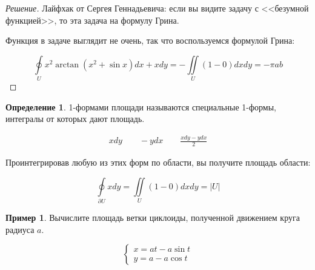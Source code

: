 \documentclass[a5paper]{article}
\newcounter{through}
\theoremstyle{plain}
\theoremstyle{definition}
\newtheorem{definition}[through]{Определение}
\newtheorem{example}[through]{Пример}
\numberwithin{through}{section}
\numberwithin{equation}{section}
\begin{document}
\begin{proof}[Решение]
	Лайфхак от Сергея Геннадьевича: если вы видите задачу с <<безумной функцией>>, то эта задача на формулу Грина.
	
	Функция в задаче выглядит не очень, так что воспользуемся формулой Грина:
	
	\begin{equation*}
	\oint\limits_{U} x^2 \arctan(x^2+\sin x)dx + xdy = -\iint\limits_{U} (1 - 0) dxdy = -\pi ab
	\end{equation*}
\end{proof}

\begin{definition}
	1-формами площади называются специальные 1-формы, интегралы от которых дают площадь.
	
	\begin{align*}
		xdy \quad \quad -ydx \quad \quad \frac{xdy-ydx}{2}
	\end{align*}
\end{definition}

Проинтегрировав любую из этих форм по области, вы получите площадь области:

\begin{equation*}
	\oint\limits_{\partial U}xdy = \iint\limits_{U} (1 - 0)dxdy = |U|
\end{equation*}

\begin{example}
	Вычислите площадь ветки циклоиды, полученной движением круга радиуса $a$.
	
	\begin{equation*}
		\begin{cases}
			x = at-a\sin t \\
			y = a - a\cos t
		\end{cases}
	\end{equation*}
\end{example}
\end{document}
